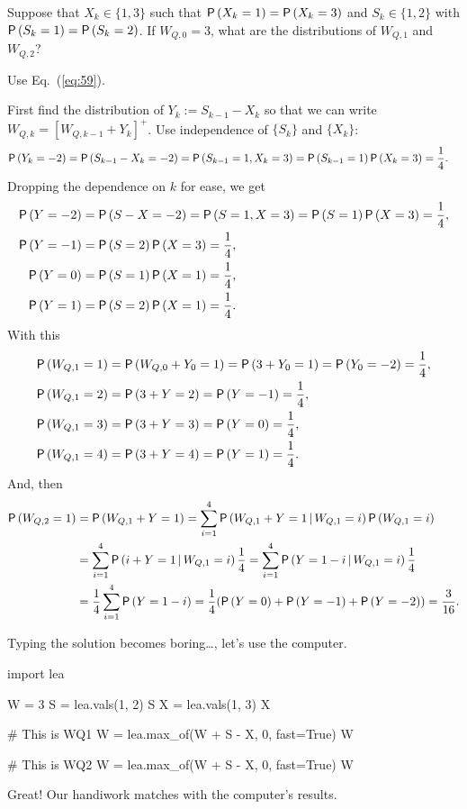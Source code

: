\begin{exercise}
  Suppose that $X_k\in\{1,3\}$ such that $\P{X_k=1}=\P{X_k=3}$ and
  $S_k\in\{1,2\}$ with $\P{S_k=1}=\P{S_k=2}$. If $W_{Q,0}=3$, what are
  the distributions of $W_{Q,1}$ and $W_{Q,2}$?  
  \begin{hint}
Use Eq.~(\ref{eq:59}).
\end{hint}
\begin{solution}  First find the distribution of $Y_k:=S_{k-1}-X_k$ so that we can write
  $W_{Q,k}=[W_{Q,k-1}+Y_k]^+$.  Use independence of $\{S_k\}$ and $\{X_k\}$:
\begin{align*}
  \P{Y_k=-2} &=\P{S_{k-1}-X_k=-2} = \P{S_{k-1}=1, X_k=3} = \P{S_{k-1}=1}\P{X_k=3} = \frac14.
\end{align*}
Dropping the dependence on $k$ for ease, we get
\begin{align*}
  \P{Y=-2} &=\P{S-X=-2} = \P{S=1, X=3} = \P{S=1}\P{X=3} = \frac14,\\
  \P{Y=-1} &=\P{S=2}\P{X=3} = \frac14,\\
  \P{Y=0} &=\P{S=1}\P{X=1} = \frac14,\\
  \P{Y=1} &=\P{S=2}\P{X=1} = \frac14.
\end{align*}
With this
  \begin{align*}
    \P{W_{Q,1} = 1} &=\P{W_{Q,0} + Y_0= 1} = \P{3 + Y_0 =1} = \P{Y_0=-2} =\frac14,\\
    \P{W_{Q,1} = 2} &= \P{3 + Y =2} = \P{Y=-1}  =\frac14,\\
    \P{W_{Q,1} = 3} &= \P{3 + Y = 3} = \P{Y=0}  =\frac14,\\
    \P{W_{Q,1} = 4} &= \P{3 + Y = 4} = \P{Y=1}  =\frac14.\\
  \end{align*}
And, then
  \begin{equation*}
    \begin{split}
    \P{W_{Q,2} = 1} 
&=\P{W_{Q,1} + Y = 1} = \sum_{i=1}^4 \P{W_{Q,1} + Y = 1\given W_{Q,1}=i}\P{W_{Q,1}=i}\\
&=\sum_{i=1}^4 \P{i + Y = 1\given W_{Q,1}=i}\frac14
=\sum_{i=1}^4 \P{Y = 1-i\given W_{Q,1}=i}\frac14\\
&=\frac14\sum_{i=1}^4 \P{Y = 1-i} = \frac14(\P{Y = 0} + \P{Y=-1} +\P{Y=-2}) = \frac{3}{16}.
    \end{split}
  \end{equation*}

Typing the solution becomes  boring\ldots, let's use the computer.

\begin{pyconsole}
import lea

W = 3
S = lea.vals(1,  2)
S
X = lea.vals(1,  3)
X

# This is WQ1
W = lea.max_of(W + S - X, 0, fast=True)
W

# This is WQ2
W = lea.max_of(W + S - X, 0, fast=True)
W
\end{pyconsole}
Great! Our handiwork matches with the computer's results. 

\end{solution}
\end{exercise}


